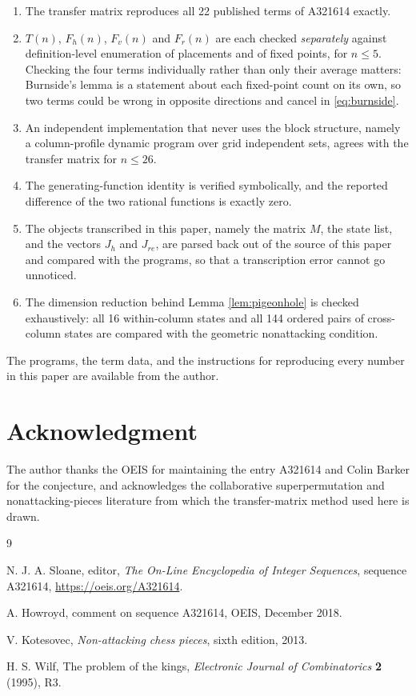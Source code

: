 \documentclass[12pt]{article}
\theoremstyle{definition}
\begin{document}
\begin{enumerate}
\item The transfer matrix reproduces all 22 published terms of A321614 exactly.

\item $T(n)$, $F_h(n)$, $F_v(n)$ and $F_r(n)$ are each checked \emph{separately}
against definition-level enumeration of placements and of fixed points, for
$n \le 5$. Checking the four terms individually rather than only their average
matters: Burnside's lemma is a statement about each fixed-point count on its
own, so two terms could be wrong in opposite directions and cancel in
\eqref{eq:burnside}.

\item An independent implementation that never uses the block structure,
namely a column-profile dynamic program over grid independent sets, agrees with
the transfer matrix for $n \le 26$.

\item The generating-function identity is verified symbolically, and the
reported difference of the two rational functions is exactly zero.

\item The objects transcribed in this paper, namely the matrix $M$, the state
list, and the vectors $J_h$ and $J_{re}$, are parsed back out of the source of
this paper and compared with the programs, so that a transcription error cannot
go unnoticed.

\item The dimension reduction behind Lemma \ref{lem:pigeonhole} is checked
exhaustively: all 16 within-column states and all 144 ordered pairs of
cross-column states are compared with the geometric nonattacking condition.

\end{enumerate}

The programs, the term data, and the instructions for reproducing every number
in this paper are available from the author.

\section{Acknowledgment}

The author thanks the OEIS for maintaining the entry A321614 and Colin Barker
for the conjecture, and acknowledges the collaborative superpermutation and
nonattacking-pieces literature from which the transfer-matrix method used here
is drawn.

\begin{thebibliography}{9}

N. J. A. Sloane, editor, \emph{The On-Line Encyclopedia of Integer Sequences},
sequence A321614, \url{https://oeis.org/A321614}.

A. Howroyd, comment on sequence A321614, OEIS, December 2018.

V. Kotesovec, \emph{Non-attacking chess pieces}, sixth edition, 2013.

H. S. Wilf, The problem of the kings, \emph{Electronic Journal of
Combinatorics} \textbf{2} (1995), R3.

\end{thebibliography}
\end{document}
